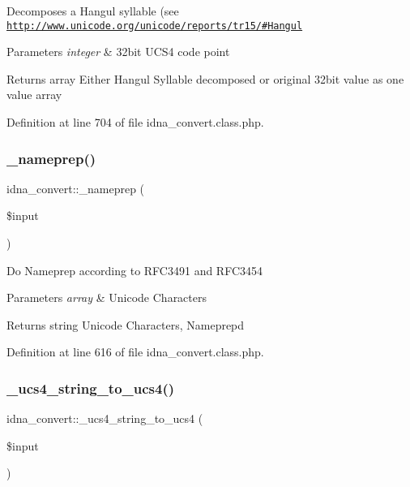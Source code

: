 Decomposes a Hangul syllable (see \href{http://www.unicode.org/unicode/reports/tr15/#Hangul}{\tt http\+://www.\+unicode.\+org/unicode/reports/tr15/\#\+Hangul} 
\begin{DoxyParams}{Parameters}
{\em integer} & 32bit U\+C\+S4 code point \\
\hline
\end{DoxyParams}
\begin{DoxyReturn}{Returns}
array Either Hangul Syllable decomposed or original 32bit value as one value array 
\end{DoxyReturn}


Definition at line 704 of file idna\+\_\+convert.\+class.\+php.

\hypertarget{classidna__convert_ac73124acc2f1e772fadd64d176bfe0b9}{}\label{classidna__convert_ac73124acc2f1e772fadd64d176bfe0b9} 
\subsubsection{\texorpdfstring{\+\_\+nameprep()}{\_nameprep()}}
{\footnotesize\ttfamily idna\+\_\+convert\+::\+\_\+nameprep (\begin{DoxyParamCaption}\item[{}]{\$input }\end{DoxyParamCaption})\hspace{0.3cm}{\ttfamily [protected]}}

Do Nameprep according to R\+F\+C3491 and R\+F\+C3454 
\begin{DoxyParams}{Parameters}
{\em array} & Unicode Characters \\
\hline
\end{DoxyParams}
\begin{DoxyReturn}{Returns}
string Unicode Characters, Nameprep\textquotesingle{}d 
\end{DoxyReturn}


Definition at line 616 of file idna\+\_\+convert.\+class.\+php.

\hypertarget{classidna__convert_ac95599caba5f1a276ba1a75a12d385dd}{}\label{classidna__convert_ac95599caba5f1a276ba1a75a12d385dd} 
\subsubsection{\texorpdfstring{\+\_\+ucs4\+\_\+string\+\_\+to\+\_\+ucs4()}{\_ucs4\_string\_to\_ucs4()}}
{\footnotesize\ttfamily idna\+\_\+convert\+::\+\_\+ucs4\+\_\+string\+\_\+to\+\_\+ucs4 (\begin{DoxyParamCaption}\item[{}]{\$input }\end{DoxyParamCaption})\hspace{0.3cm}{\ttfamily [protected]}}

